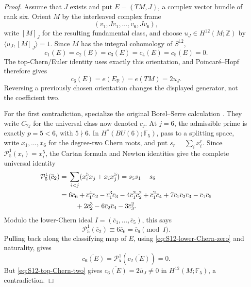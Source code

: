 \documentclass[11pt,letterpaper]{article}
\numberwithin{equation}{section}
\theoremstyle{definition}
\theoremstyle{remark}
\newcommand{\R}{\mathbb R}
\newcommand{\Z}{\mathbb Z}
\begin{document}
\begin{proof}
Assume that \(J\) exists and put \(E=(TM,J)\), a complex vector bundle of
rank six.  Orient \(M\) by the interleaved complex frame
\[
 (v_1,Jv_1,\ldots,v_6,Jv_6),
\]
write \([M]_J\) for the resulting fundamental class, and choose
\(u_J\in H^{12}(M;\Z)\) by
 \(\langle u_J,[M]_J\rangle=1\).  Since \(M\) has the integral cohomology
of \(S^{12}\),
\begin{equation}
 c_1(E)=c_2(E)=c_3(E)=c_4(E)=c_5(E)=0.
 \label{eq:S12-lower-Chern-zero}
\end{equation}
The top-Chern/Euler identity uses exactly this orientation, and
Poincar\'e--Hopf therefore gives
\begin{equation}
 c_6(E)=e(E_{\R})=e(TM)=2u_J.
 \label{eq:S12-top-Chern-two}
\end{equation}
Reversing a previously chosen orientation changes the displayed generator,
not the coefficient two.

For the first contradiction, specialize the original Borel--Serre
calculation
\citep[\S12, Proposition~12.4, Lemma~12.5, and Proposition~12.6,
p.~430; \S15, Proposition~15.1, p.~434]{BorelSerre1953}.
They write \(C_{2j}\) for the universal class now denoted \(c_j\).  At
\(j=6\), the admissible prime is exactly \(p=5<6\), with \(5\nmid6\).
In \(H^*(BU(6);\mathbb F_5)\), pass to a splitting space, write
\(x_1,\ldots,x_6\) for the degree-two Chern roots, and put
\(s_r=\sum_i x_i^r\).  Since
\(\mathcal P_5^1(x_i)=x_i^5\), the Cartan formula and Newton identities
give the complete universal identity
\begin{align}
 \mathcal P_5^1(\overline c_2)
 ={}&\sum_{i<j}(x_i^5x_j+x_ix_j^5)=s_5s_1-s_6 \notag\\
 ={}&6\overline c_6+\overline c_1^4\overline c_2
 -\overline c_1^3\overline c_3
 -4\overline c_1^2\overline c_2^2
 +\overline c_1^2\overline c_4
 +7\overline c_1\overline c_2\overline c_3
 -\overline c_1\overline c_5 \notag\\
 &\quad+2\overline c_2^3-6\overline c_2\overline c_4
 -3\overline c_3^2.
 \label{eq:S12-P1-exact}
\end{align}
Modulo the lower-Chern ideal
\(I=(\overline c_1,\ldots,\overline c_5)\), this says
\[
 \mathcal P_5^1(\overline c_2)
 \equiv6\overline c_6=\overline c_6\pmod I.
\]
Pulling back along the classifying map of \(E\), using
\cref{eq:S12-lower-Chern-zero} and naturality, gives
\[
 \overline{c_6(E)}=\mathcal P_5^1(\overline{c_2(E)})=0.
\]
But \cref{eq:S12-top-Chern-two} gives
\(\overline{c_6(E)}=2\overline u_J\ne0\) in
\(H^{12}(M;\mathbb F_5)\), a contradiction.


\end{proof}
\end{document}
